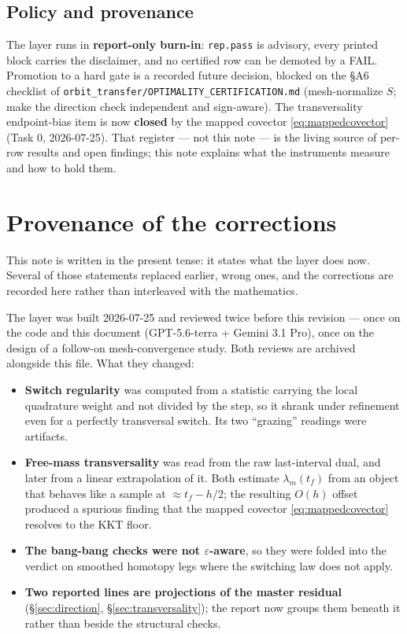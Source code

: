\documentclass[11pt]{article}
\newcommand{\file}[1]{\texttt{#1}}
\newcommand{\code}[1]{\texttt{#1}}
\begin{document}
\subsection{Policy and provenance}

The layer runs in \textbf{report-only burn-in}: \code{rep.pass} is advisory,
every printed block carries the disclaimer, and no certified row can be
demoted by a FAIL. Promotion to a hard gate is a recorded future decision,
blocked on the \S A6 checklist of
\file{orbit\_transfer/OPTIMALITY\_CERTIFICATION.md} (mesh-normalize
$\dot S$; make the direction check independent and sign-aware). The
transversality endpoint-bias item is now \textbf{closed} by the mapped
covector \eqref{eq:mappedcovector} (Task 0, 2026-07-25). That register --- not this note --- is the
living source of per-row results and open findings; this note explains what
the instruments measure and how to hold them.

\appendix
\section{Provenance of the corrections}
\label{sec:provenance}

This note is written in the present tense: it states what the layer does now.
Several of those statements replaced earlier, wrong ones, and the corrections
are recorded here rather than interleaved with the mathematics.

The layer was built 2026-07-25 and reviewed twice before this revision --- once
on the code and this document (GPT-5.6-terra + Gemini 3.1 Pro), once on the
design of a follow-on mesh-convergence study. Both reviews are archived
alongside this file. What they changed:

\begin{itemize}[leftmargin=1.4em,nosep]
\item \textbf{Switch regularity} was computed from a statistic carrying the
      local quadrature weight and not divided by the step, so it shrank under
      refinement even for a perfectly transversal switch. Its two ``grazing''
      readings were artifacts.
\item \textbf{Free-mass transversality} was read from the raw last-interval
      dual, and later from a linear extrapolation of it. Both estimate
      $\lambda_m(t_f)$ from an object that behaves like a sample at
      $\approx t_f - h/2$; the resulting $O(h)$ offset produced a spurious
      finding that the mapped covector \eqref{eq:mappedcovector} resolves to
      the KKT floor.
\item \textbf{The bang-bang checks were not $\varepsilon$-aware}, so they were
      folded into the verdict on smoothed homotopy legs where the switching
      law does not apply.
\item \textbf{Two reported lines are projections of the master residual}
      (\S\ref{sec:direction}, \S\ref{sec:transversality}); the report now
      groups them beneath it rather than beside the structural checks.
\end{itemize}
\end{document}
